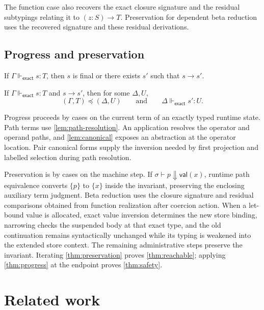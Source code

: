 \documentclass[acmsmall,screen,nonacm]{acmart}
\newcommand{\sing}[1]{\{#1\}}
\newcommand{\sstep}{\longrightarrow}
\newcommand{\resolve}{\Downarrow}
\newcommand{\struct}{\Vdash}
\newcommand{\exact}{\mathsf{exact}}
\begin{document}
The function case also recovers the exact closure signature and the residual
subtypings relating it to \((z:S)\to T\). Preservation for dependent beta
reduction uses the recovered signature and these residual derivations.

\subsection{Progress and preservation}

\begin{theorem}[Progress]
\label{thm:progress}
If \(\Gamma\struct_{\exact}s:T\), then \(s\) is final or there exists \(s'\)
such that \(s\sstep s'\).
\end{theorem}

\begin{theorem}[Preservation]
\label{thm:preservation}
If \(\Gamma\struct_{\exact}s:T\) and \(s\sstep s'\), then for some
\(\Delta,U\),
\[
(\Gamma,T)\preceq(\Delta,U)
\qquad\text{and}\qquad
\Delta\struct_{\exact}s':U.
\]
\end{theorem}

Progress proceeds by cases on the current term of an exactly typed runtime
state. Path terms use \cref{lem:path-resolution}. An application resolves the
operator and operand paths, and \cref{lem:canonical} exposes an abstraction
at the operator location. Pair canonical forms supply the inversion needed by
first projection and labelled selection during path resolution.

Preservation is by cases on the machine step. If
\(\sigma\vdash p\resolve\mathsf{val}(x)\), runtime path equivalence converts
\(\sing{p}\) to \(\sing{x}\) inside the invariant, preserving the enclosing
auxiliary term judgment. Beta reduction uses the closure signature and
residual comparisons obtained from function realization after coercion
action.
When a let-bound value is allocated, exact value inversion determines the new
store binding, narrowing checks the suspended body at that exact type, and
the old continuation remains syntactically unchanged while its typing is
weakened into the extended store context. The remaining administrative steps
preserve the invariant. Iterating
\cref{thm:preservation} proves \cref{thm:reachable}; applying
\cref{thm:progress} at the endpoint proves \cref{thm:safety}.

\section{Related work}
\end{document}
